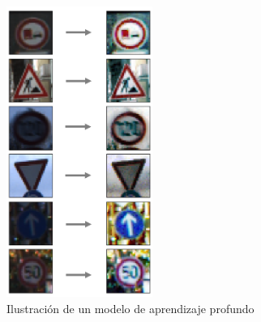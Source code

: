 		\begin{figure}[H]
			\begin{center}
			\includegraphics[height=9.5cm]{images/desarrollo/Augment/equalize_hist2_wo_Norm_woRepetition}
			\end{center}
			\begin{center}
			\caption{\small{Ilustración de un modelo de aprendizaje profundo}}
			\vspace{-1em}
		{\small{\fontsize{10}{16.8}\selectfont {Fuente propia}}}
			\end{center}
			\vspace{-1.5em}
		\end{figure}
	
